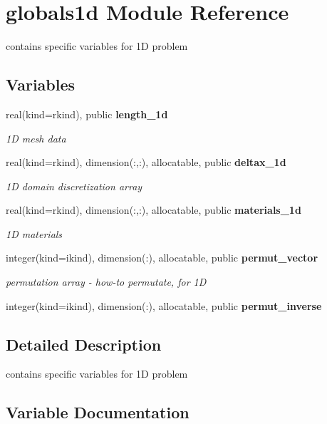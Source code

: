 \section{globals1d Module Reference}
\label{namespaceglobals1d}


contains specific variables for 1D problem  


\subsection*{Variables}
\begin{DoxyCompactItemize}
\item 
real(kind=rkind), public {\bf length\+\_\+1d}
\begin{DoxyCompactList}\small\item\em 1D mesh data \end{DoxyCompactList}\item 
real(kind=rkind), dimension(\+:,\+:), allocatable, public {\bf deltax\+\_\+1d}
\begin{DoxyCompactList}\small\item\em 1D domain discretization array \end{DoxyCompactList}\item 
real(kind=rkind), dimension(\+:,\+:), allocatable, public {\bf materials\+\_\+1d}
\begin{DoxyCompactList}\small\item\em 1D materials \end{DoxyCompactList}\item 
integer(kind=ikind), dimension(\+:), allocatable, public {\bf permut\+\_\+vector}
\begin{DoxyCompactList}\small\item\em permutation array -\/ how-\/to permutate, for 1D \end{DoxyCompactList}\item 
integer(kind=ikind), dimension(\+:), allocatable, public {\bf permut\+\_\+inverse}
\end{DoxyCompactItemize}


\subsection{Detailed Description}
contains specific variables for 1D problem 

\subsection{Variable Documentation}
